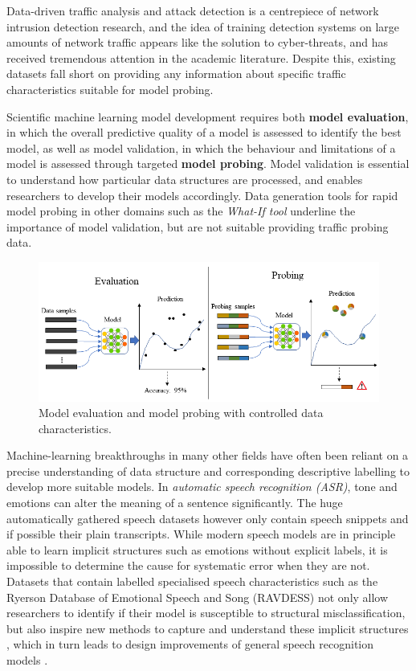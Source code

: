 \documentclass[runningheads]{llncs}
\begin{document}
Data-driven traffic analysis and attack detection is a centrepiece of network intrusion detection research, and the idea of training detection systems on large amounts of network traffic %
appears like the solution to cyber-threats, and has received tremendous attention in the academic literature. Despite this, existing datasets fall short on providing any information about specific traffic characteristics suitable for model probing.%

Scientific machine learning model development requires both \textbf{model evaluation}, in which the overall predictive quality of a model is assessed to identify the best model, as well as model validation, in which the behaviour and limitations of a model is assessed through targeted \textbf{model probing}. Model validation is essential to understand how particular data structures are processed, and enables researchers to develop their models accordingly. Data generation tools for rapid model probing in other domains such as the \textit{What-If tool} \cite{wexler2019if} underline the importance of model validation, but are not suitable providing traffic probing data.

\begin{figure}
\centering
\includegraphics[width=\textwidth]{images/Eva_Prob.png}
\caption{Model evaluation and model probing with controlled data characteristics.}
\end{figure}

Machine-learning breakthroughs in many other fields have often been reliant on a precise understanding of data structure and corresponding descriptive labelling to develop more suitable models.
In \textit{automatic speech recognition (ASR)}, tone and emotions can alter the meaning of a sentence significantly. The huge automatically gathered speech datasets however only contain speech snippets and if possible their plain transcripts. While modern speech models are in principle able to learn implicit structures such as emotions without explicit labels, it is impossible to determine the cause for systematic error when they are not. Datasets that contain labelled specialised speech characteristics such as the Ryerson Database of Emotional Speech and Song (RAVDESS) \cite{livingstone2018ryerson} not only allow researchers to identify if their model is susceptible to structural misclassification, but also inspire new methods to capture and understand these implicit structures \cite{haque2019audio}, which in turn leads to design improvements of general speech recognition models \cite{kamper2020multilingual}.
\end{document}
